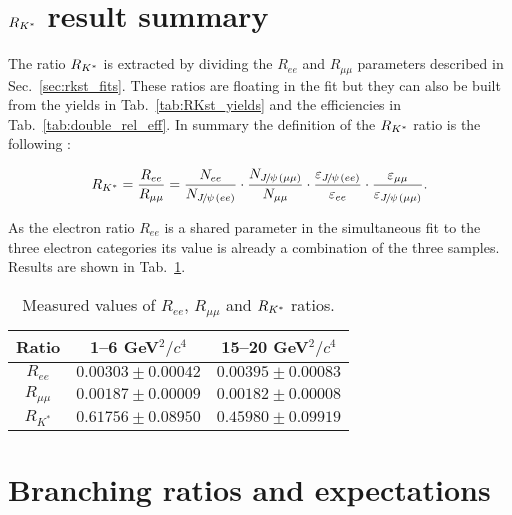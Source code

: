\section{$R_{{{K}^*}}$ result summary}

The ratio $R_{{{K}^*}}$ is extracted by dividing the $R_{ee}$ and $R_{\mu\mu}$
parameters described in Sec.~\ref{sec:rkst_fits}. These ratios are 
floating in the fit but they can also be built from the yields
in Tab.~\ref{tab:RKst_yields} and the efficiencies in Tab.~\ref{tab:double_rel_eff}.
In summary the definition of the $R_{{{K}^*}}$ ratio is the following :

\begin{equation}
R_{\Kstar} = \frac{R_{ee}}{R_{\mu\mu}}  
= \frac{N_{ee}}{N_{\jpsi(ee)}} 
\cdot \frac{N_{\jpsi(\mu\mu)}}{N_{\mu\mu}}
\cdot \frac{\varepsilon_{\jpsi(ee)}}{\varepsilon_{ee}} 
\cdot \frac{\varepsilon_{\mu\mu}}{\varepsilon_{\jpsi(\mu\mu)}}.
\end{equation}

As the electron ratio $R_{ee}$ is a shared parameter in the simultaneous fit to the
three electron categories its value is already a combination of the three samples.
Results are shown in Tab.~\ref{tab:RKst_results}.

\begin{table}
\centering
 \caption{Measured values of $R_{ee}$, $R_{\mu\mu}$ and $R_{{{K}^*}}$ ratios.}
\begin{tabular}{|c|c|c|}
\hline
 Ratio 			& 1--6 GeV$^2/c^4$ & 15--20 GeV$^2/c^4$\\ \hline
 $R_{ee}$ 	& $ 0.00303  \pm  0.00042 $ 	& $ 0.00395  \pm  0.00083 $ \\
 $R_{\mu\mu}$ 	& $ 0.00187  \pm  0.00009 $ 	& $ 0.00182  \pm  0.00008 $ \\
\hline $R_{K^*}$ 	& $ 0.61756  \pm  0.08950 $ 	& $ 0.45980  \pm  0.09919 $ \\
\hline 
 \end{tabular}
 \label{tab:RKst_results}
\end{table}

\section{Branching ratios and expectations}

